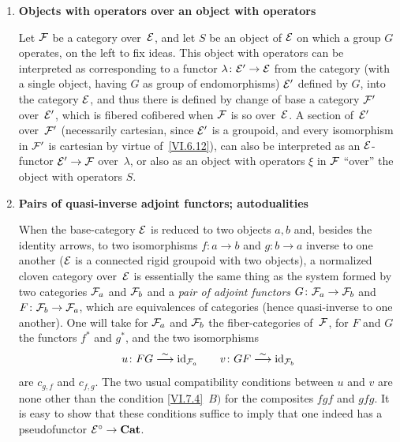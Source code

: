 \begin{enumerate}
\medskip
\item[c)] \textbf{Objects with operators over an object
with operators}

Let $\cal{F}$ be a category over~$\cal{E}$, and let $S$ be an object of
$\cal{E}$ on which a group $G$ operates, on the left to fix
ideas. This object with operators can be interpreted as
corresponding to a functor $\lambda\colon\cal{E}'\to \cal{E}$ from
the category (with a single object, having $G$ as group
of endomorphisms) $\cal{E}'$ defined by $G$, into the
category $\cal{E}$, and thus there is defined by change of base
a category $\cal{F}'$ over~$\cal{E}'$, which is
fibered \resp cofibered when $\cal{F}$ is so
over~$\cal{E}$. A
section of~$\cal{E}'$ over~$\cal{F}'$ (necessarily
cartesian, since $\cal{E}'$ is a groupoid, and every
isomorphism in $\cal{F}'$ is cartesian by virtue
of~\ref{VI.6.12}), can also be interpreted as an
$\cal{E}$-functor $\cal{E}'\to\cal{F}$ over~$\lambda$, or
also as an object with operators $\xi$ in $\cal{F}$
``over'' the object with operators $S$.

\medskip
\item[d)] \textbf{Pairs of quasi-inverse adjoint functors;
autodualities}

When the base-category $\cal{E}$ is reduced to two
objects $a,b$ and, besides the identity arrows, to two
isomorphisms $f\colon a\to b$ and $g\colon b\to a$ inverse to one
another (\ie $\cal{E}$ is a connected rigid groupoid with two
objects), a normalized cloven category over~$\cal{E}$ is
essentially the same thing as the system formed by
two categories $\cal{F}_a$ and $\cal{F}_b$ and a \emph{pair of
adjoint functors} $G\colon \cal{F}_a\to\cal{F}_b$ and $F\colon
\cal{F}_b\to\cal{F}_a$, which are equivalences of
categories (hence quasi-inverse to one another). One will take for
$\cal{F}_a$ and $\cal{F}_b$ the fiber-categories of~$\cal{F}$,
for $F$ and $G$ the functors $f^*$ and $g^*$, and the two
isomorphisms
$$
u\colon FG\isomto\id_{\cal{F}_a}\qquad v\colon
GF\isomto\id_{\cal{F}_b}
$$
are $c_{g,f}$ and $c_{f,g}$. The two usual
compatibility conditions between $u$ and $v$ are none other than the condition
\ref{VI.7.4}~$B)$ for the composites $fgf$ and $gfg$. It is easy
to show that these conditions suffice to imply that one indeed has
a pseudofunctor $\cal{E}^\circ\to\Cat$.


\end{enumerate}

